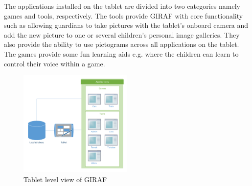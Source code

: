 The applications installed on the tablet are divided into two categories namely games and tools, respectively. The tools provide GIRAF with core functionality such as allowing guardians to take pictures with the tablet's onboard camera and add the new picture to one or several children's personal image galleries. They also provide the ability to use pictograms across all applications on the tablet. The games provide some fun learning aids e.g. where the children can learn to control their voice within a game. 

\begin{figure}[htpb]
\begin{center}
\includegraphics[width=0.5\textwidth]{img/tablet_level.pdf}
\caption{Tablet level view of GIRAF}
\label{fig:tablet_level}
\end{center}
\end{figure}
